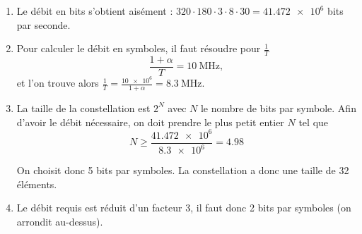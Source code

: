 \documentclass [a4paper, 11pt] {article}
\begin{document}
        
    \begin{reponse}
        \begin{enumerate}
            \item Le débit en bits s'obtient aisément : $320\cdot180\cdot3\cdot8\cdot30= \num{41.472e6}$ bits par seconde.
            \item Pour calculer le débit en symboles, il faut résoudre pour $\frac{1}{T}$
            \begin{equation}
                \frac{1+\alpha}{T} = \SI{10}{\mega\hertz},
            \end{equation}
            et l'on trouve alors $\frac{1}{T} = \frac{\num{10e6}}{1 + \alpha}= \SI{8.3}{\mega\hertz}$.
            \item La taille de la constellation est $2^N$ avec $N$ le nombre de bits par symbole. Afin d'avoir le débit nécessaire, on doit prendre le plus petit entier $N$ tel que
            \begin{equation}
                N \ge \frac{\num{41.472e6}}{\num{8.3e6}} = 4.98
            \end{equation}
            
            On choisit donc 5 bits par symboles. La constellation a donc une taille de 32 éléments.
            \item Le débit requis est réduit d'un facteur 3, il faut donc 2 bits par symboles (on arrondit au-dessus).
        \end{enumerate}
    \end{reponse}
\end{document}
